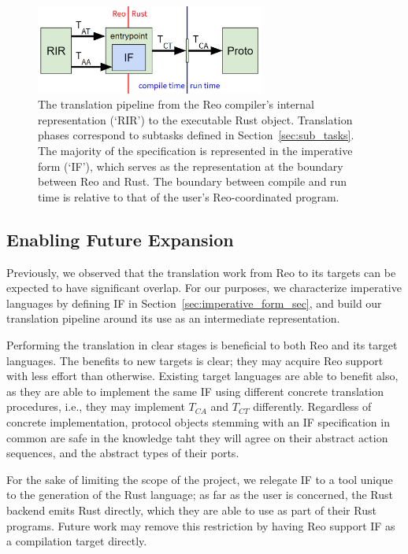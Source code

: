 \begin{figure}
	\centering
	\includegraphics[width=0.67\textwidth]{pipeline.png}
	\caption[Reo to Rust code generation pipeline.]{The translation pipeline from the Reo compiler's internal representation (`RIR') to the executable Rust  object. Translation phases correspond to subtasks defined in Section~\ref{sec:sub_tasks}. The majority of the specification is represented in the imperative form (`IF'), which serves as the representation at the boundary between Reo and Rust. The boundary between compile and run time is relative to that of the user's Reo-coordinated program.}
	\label{fig:pipeline}
\end{figure}

\subsection{Enabling Future Expansion}
Previously, we observed that the translation work from Reo to its targets can be expected to have significant overlap. For our purposes, we characterize imperative languages by defining IF in Section~\ref{sec:imperative_form_sec}, and build our translation pipeline around its use as an intermediate representation.

Performing the translation in clear stages is beneficial to both Reo and its target languages. The benefits to new targets is clear; they may acquire Reo support with less effort than otherwise. Existing target languages are able to benefit also, as they are able to implement the same IF using different concrete translation procedures, i.e., they may implement $T_{CA}$ and $T_{CT}$ differently. Regardless of concrete implementation, protocol objects stemming with an IF specification in common are safe in the knowledge taht they will agree on their abstract action sequences, and the abstract types of their ports.

For the sake of limiting the scope of the project, we relegate IF to a tool unique to the generation of the Rust language; as far as the user is concerned, the Rust backend emits Rust directly, which they are able to use as part of their Rust programs. Future work may remove this restriction by having Reo support IF as a compilation target directly.


